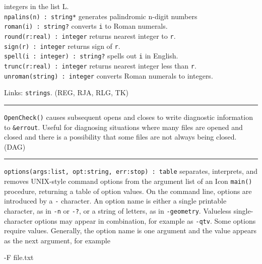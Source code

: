 integers in the list L.\\
\texttt{npalins(n) : string*} generates palindromic n-digit
numbers\\
\texttt{roman(i) : string?} converts \texttt{i} to Roman numerals.\\
\texttt{round(r:real) : integer} returns nearest integer to
\texttt{r}.\\
\texttt{sign(r) : integer} returns sign of \texttt{r}.\\
\texttt{spell(i : integer) : string?} spells out \texttt{i} in
English.\\
\texttt{trunc(r:real) : integer} returns nearest integer less than
\texttt{r}.\\
\texttt{unroman(string) : integer} converts Roman numerals to integers.

Links: \texttt{strings}. (REG, RJA, RLG, TK)

\vspace{0.25cm}\hrule{}

\texttt{OpenCheck()} causes subsequent opens and closes to write
diagnostic information to \texttt{\&errout}. Useful for diagnosing
situations where many files are opened and closed and there is a
possibility that some files are not always being closed. (DAG)

\vspace{0.25cm}\hrule{}

\texttt{options(args:list, opt:string, err:stop) : table} separates,
interprets, and removes UNIX-style command
options from the argument list of an Icon \texttt{main()} procedure,
returning a table of option values. On the command line, options are
introduced by a \texttt{{\textquotedbl}-{\textquotedbl}} character. An
option name is either a single printable character, as in
\texttt{{\textquotedbl}-n{\textquotedbl}} or
\texttt{{\textquotedbl}-?{\textquotedbl}}, or a string of letters, as
in \texttt{{\textquotedbl}-geometry{\textquotedbl}}. Valueless
single-character options may appear in combination, for example as
\texttt{{\textquotedbl}-qtv{\textquotedbl}}. Some options require
values. Generally, the option name is one argument and the value
appears as the next argument, for example

{\ttfamily
{\textquotedbl}-F file.txt{\textquotedbl}}

